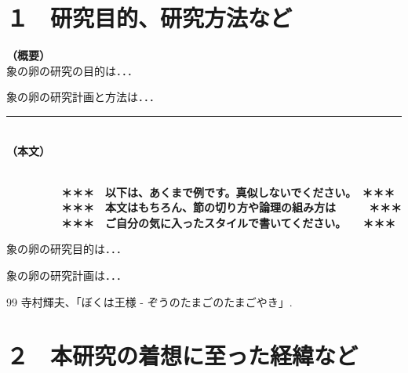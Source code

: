 \documentclass[11pt,a4j,dvipdfmx]{jarticle} 					%
\newcommand{\研究課題名}{象の卵}
\newcommand{\研究機関名}{逢坂大学}
\newcommand{\研究代表者氏名}{湯川秀樹}
\newcommand{\研究期間の最終元号年度}{7}  %
\begin{document}

\section{１　研究目的、研究方法など}

\noindent
\textbf{（概要）}\\
	象の卵の研究の目的は．．．	

	象の卵の研究計画と方法は．．．
	\vspace*{10zw}	%

\noindent
\rule{\linewidth}{1pt}\\
\noindent
\textbf{（本文）}
\JSPSInstructions	%

\textbf{\\　　　　　＊＊＊　以下は、あくまで例です。真似しないでください。　＊＊＊\\
　　　　　＊＊＊　本文はもちろん、節の切り方や論理の組み方は　　　＊＊＊\\
　　　　　＊＊＊　ご自分の気に入ったスタイルで書いてください。　　＊＊＊}

	 象の卵の研究目的は．．．

	象の卵の研究計画は．．．

		

	\vspace{1cm}
	\begin{thebibliography}{99}
		 寺村輝夫、「ぼくは王様 - ぞうのたまごのたまごやき」.
	\end{thebibliography}




\section{２　本研究の着想に至った経緯など}
\end{document}
